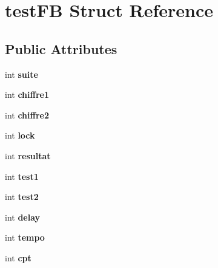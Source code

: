\hypertarget{structtestFB}{}\section{test\+FB Struct Reference}
\label{structtestFB}
\subsection*{Public Attributes}
\begin{DoxyCompactItemize}
\item 
int {\bfseries suite}\hypertarget{structtestFB_a514b694eb0819995854779f7f7fc2422}{}\label{structtestFB_a514b694eb0819995854779f7f7fc2422}

\item 
int {\bfseries chiffre1}\hypertarget{structtestFB_a356f4fce8c2f522fd08f4c45a5f59570}{}\label{structtestFB_a356f4fce8c2f522fd08f4c45a5f59570}

\item 
int {\bfseries chiffre2}\hypertarget{structtestFB_a993aa24e718fb4568cd55d88feecb851}{}\label{structtestFB_a993aa24e718fb4568cd55d88feecb851}

\item 
int {\bfseries lock}\hypertarget{structtestFB_ae5894b1b7d2f0cd2fdbef84240db5110}{}\label{structtestFB_ae5894b1b7d2f0cd2fdbef84240db5110}

\item 
int {\bfseries resultat}\hypertarget{structtestFB_a44413d12389c0a742dbe1e0df4c104cc}{}\label{structtestFB_a44413d12389c0a742dbe1e0df4c104cc}

\item 
int {\bfseries test1}\hypertarget{structtestFB_afa42eb35c54a2f27711057c5ef41237a}{}\label{structtestFB_afa42eb35c54a2f27711057c5ef41237a}

\item 
int {\bfseries test2}\hypertarget{structtestFB_a8f0856b06ab5e0822da706e8ed6f6e6e}{}\label{structtestFB_a8f0856b06ab5e0822da706e8ed6f6e6e}

\item 
int {\bfseries delay}\hypertarget{structtestFB_afce45aec2fc30e60d9261d5f5a3975d5}{}\label{structtestFB_afce45aec2fc30e60d9261d5f5a3975d5}

\item 
int {\bfseries tempo}\hypertarget{structtestFB_ac9594af7975494d3f8c232458f72ee38}{}\label{structtestFB_ac9594af7975494d3f8c232458f72ee38}

\item 
int {\bfseries cpt}\hypertarget{structtestFB_aa9a520b6a87fe214467f1ab30e4cab53}{}\label{structtestFB_aa9a520b6a87fe214467f1ab30e4cab53}


\end{DoxyCompactItemize}
